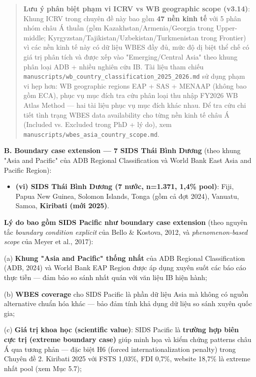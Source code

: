 \documentclass[12pt,a4paper]{article}
\providecommand{\tightlist}{\setlength{\itemsep}{0pt}\setlength{\parskip}{0pt}}
\begin{document}
\begin{quote}
\textbf{Lưu ý phân biệt phạm vi ICRV vs WB geographic scope (v3.14)}:
Khung ICRV trong chuyên đề này bao gồm \textbf{47 nền kinh tế} với 5
phân nhóm châu Á thuần (gồm Kazakhstan/Armenia/Georgia trong
Upper-middle; Kyrgyzstan/Tajikistan/Uzbekistan/Turkmenistan trong
Frontier) vì các nền kinh tế này có dữ liệu WBES đầy đủ, mức độ dị biệt
thể chế có giá trị phân tích và được xếp vào "Emerging/Central Asia"
theo khung phân loại ADB + nhiều nghiên cứu IB. Tài liệu tham chiếu
\texttt{manuscripts/wb\_country\_classification\_2025\_2026.md} sử dụng
phạm vi hẹp hơn: WB geographic regions EAP + SAS + MENAAP (không bao gồm
ECA), phục vụ mục đích tra cứu phân loại thu nhập FY2026 WB Atlas Method
--- hai tài liệu phục vụ mục đích khác nhau. Để tra cứu chi tiết tình
trạng WBES data availability cho từng nền kinh tế châu Á (Included vs.
Excluded trong PhD + lý do), xem
\texttt{manuscripts/wbes\_asia\_country\_scope.md}.
\end{quote}

\textbf{B. Boundary case extension --- 7 SIDS Thái Bình Dương} (theo
khung "Asia and Pacific" của ADB Regional Classification và World Bank
East Asia and Pacific Region):

\begin{itemize}
\tightlist
\item
  \textbf{(vi) SIDS Thái Bình Dương (7 nước, n=1.371, 1,4\% pool)}:
  Fiji, Papua New Guinea, Solomon Islands, Tonga (gồm cả đợt 2024),
  Vanuatu, Samoa, \textbf{Kiribati (mới 2025)}.
\end{itemize}

\textbf{Lý do bao gồm SIDS Pacific như boundary case extension} (theo
nguyên tắc \emph{boundary condition explicit} của Bello \& Kostova,
2012, và \emph{phenomenon-based scope} của Meyer et al., 2017):

(a) \textbf{Khung "Asia and Pacific" thống nhất} của ADB Regional
Classification (ADB, 2024) và World Bank EAP Region được áp dụng xuyên
suốt các báo cáo thực tiễn --- đảm bảo so sánh nhất quán với văn liệu IB
hiện hành;

(b) \textbf{WBES coverage} cho SIDS Pacific là phần dữ liệu Asia mà
không có nguồn alternative chuẩn hóa khác --- bảo đảm tính khả dụng dữ
liệu so sánh xuyên quốc gia;

(c) \textbf{Giá trị khoa học (scientific value)}: SIDS Pacific là
\textbf{trường hợp biên cực trị (extreme boundary case)} giúp minh họa
và kiểm chứng patterns châu Á qua tương phản --- đặc biệt H6 (forced
internationalization penalty) trong Chuyên đề 2. Kiribati 2025 với FSTS
1,03\%, FDI 0,7\%, website 18,7\% là extreme nhất pool (xem Mục 5.7);
\end{document}
